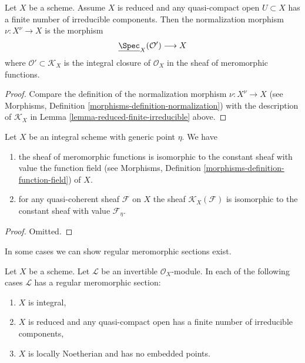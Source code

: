 \begin{lemma}
\label{lemma-reduced-normalization}
Let $X$ be a scheme.
Assume $X$ is reduced and any quasi-compact open $U \subset X$
has a finite number of irreducible components.
Then the normalization morphism $\nu : X^\nu \to X$ is the
morphism
$$
\underline{\Spec}_X(\mathcal{O}') \longrightarrow X
$$
where $\mathcal{O}' \subset \mathcal{K}_X$ is the integral
closure of $\mathcal{O}_X$ in the sheaf of meromorphic functions.
\end{lemma}

\begin{proof}
Compare the definition of the normalization morphism
$\nu : X^\nu \to X$ (see
Morphisms, Definition \ref{morphisms-definition-normalization})
with the description of $\mathcal{K}_X$ in
Lemma \ref{lemma-reduced-finite-irreducible} above.
\end{proof}

\begin{lemma}
\label{lemma-meromorphic-functions-integral-scheme}
Let $X$ be an integral scheme with generic point $\eta$. We have
\begin{enumerate}
\item the sheaf of meromorphic functions is
isomorphic to the constant sheaf with value the
function field (see
Morphisms, Definition \ref{morphisms-definition-function-field})
of $X$.
\item for any quasi-coherent sheaf $\mathcal{F}$ on $X$ the
sheaf $\mathcal{K}_X(\mathcal{F})$ is isomorphic to the
constant sheaf with value $\mathcal{F}_\eta$.
\end{enumerate}
\end{lemma}

\begin{proof}
Omitted.
\end{proof}

\noindent
In some cases we can show regular meromorphic sections exist.

\begin{lemma}
\label{lemma-regular-meromorphic-section-exists}
Let $X$ be a scheme.
Let $\mathcal{L}$ be an invertible $\mathcal{O}_X$-module.
In each of the following cases $\mathcal{L}$ has a regular meromorphic
section:
\begin{enumerate}
\item $X$ is integral,
\item $X$ is reduced and any quasi-compact open has a finite
number of irreducible components,
\item $X$ is locally Noetherian and has no embedded points.
\end{enumerate}
\end{lemma}

